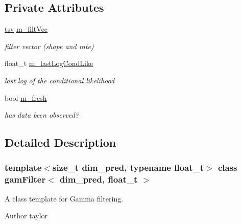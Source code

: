 \subsection*{Private Attributes}
\begin{DoxyCompactItemize}
\item 
\mbox{\label{classgamFilter_a6ab069a63962551ef8b580cb9eb681c9}} 
\hyperlink{classgamFilter_ab8cbe50cc21d9a9474c0e2b9b45a6162}{tsv} \hyperlink{classgamFilter_a6ab069a63962551ef8b580cb9eb681c9}{m\+\_\+filt\+Vec}
\begin{DoxyCompactList}\small\item\em filter vector (shape and rate) \end{DoxyCompactList}\item 
\mbox{\label{classgamFilter_a15774fb5c9c20bff2f0f99cf52a2445f}} 
float\+\_\+t \hyperlink{classgamFilter_a15774fb5c9c20bff2f0f99cf52a2445f}{m\+\_\+last\+Log\+Cond\+Like}
\begin{DoxyCompactList}\small\item\em last log of the conditional likelihood \end{DoxyCompactList}\item 
\mbox{\label{classgamFilter_a6bf29aaf7b43bb446821f06ea643df3f}} 
bool \hyperlink{classgamFilter_a6bf29aaf7b43bb446821f06ea643df3f}{m\+\_\+fresh}
\begin{DoxyCompactList}\small\item\em has data been observed? \end{DoxyCompactList}\end{DoxyCompactItemize}


\subsection{Detailed Description}
\subsubsection*{template$<$size\+\_\+t dim\+\_\+pred, typename float\+\_\+t$>$\newline
class gam\+Filter$<$ dim\+\_\+pred, float\+\_\+t $>$}

A class template for Gamma filtering. 

\begin{DoxyAuthor}{Author}
taylor 
\end{DoxyAuthor}


